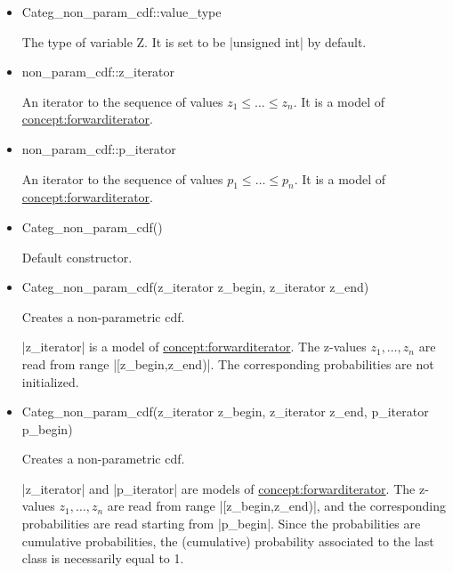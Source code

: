 \documentclass[12pt,twoside]{report}
\begin{document}
\begin{itemize}
\item 
\begin{code}
Categ_non_param_cdf::value_type
\end{code}

The type of variable Z. It is set to be |unsigned int| by default.

\item 
\begin{code}
non_param_cdf::z_iterator
\end{code}

An iterator to the sequence of values $z_1 \le \ldots \le z_n$. It is a model of \hyperref{Forward Iterator}{Forward Iterator (see Section}{)}{concept:forwarditerator}.

\item 
\begin{code}
non_param_cdf::p_iterator
\end{code}

An iterator to the sequence of values $p_1 \le \ldots \le p_n$. It is a model of \hyperref{Forward Iterator}{Forward Iterator (see Section}{)}{concept:forwarditerator}.


\item
 \begin{code}
Categ_non_param_cdf()
\end{code}

Default constructor.

\item
 \begin{code}
Categ_non_param_cdf(z_iterator z_begin, z_iterator z_end)
\end{code}

Creates a non-parametric cdf. 

|z_iterator| is a model of \hyperref{Forward Iterator}{Forward Iterator (see Section}{)}{concept:forwarditerator}. The z-values $z_1,\ldots,z_n$ are read from range |[z_begin,z_end)|. The corresponding probabilities are not initialized.

\item
 \begin{code}
Categ_non_param_cdf(z_iterator z_begin, z_iterator z_end,
                    p_iterator p_begin)
\end{code}

Creates a non-parametric cdf. 

|z_iterator| and |p_iterator| are models of \hyperref{Forward Iterator}{Forward Iterator (see Section}{)}{concept:forwarditerator}.
The z-values $z_1,\ldots,z_n$ are read from range |[z_begin,z_end)|, and the corresponding probabilities are read starting from |p_begin|. Since the probabilities are cumulative probabilities, the (cumulative) probability associated to the last class is necessarily equal to 1.



\end{itemize}
\end{document}
